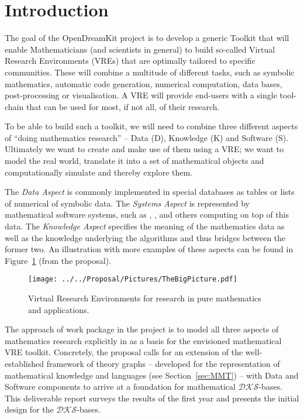 \section{Introduction}\label{sec:intro}

The goal of the OpenDreamKit project \cite{ODKproposal:on} is to develop a generic Toolkit
that will enable Mathematicians (and scientists in general) to build so-called Virtual
Research Environments (VREs) that are optimally tailored to specific communities. These
will combine a multitude of different tasks, such as symbolic mathematics, automatic code
generation, numerical computation, data bases, post-processing or visualisation. A VRE
will provide end-users with a single tool-chain that can be used for most, if not all, of
their research.

To be able to build such a toolkit, we will need to combine three different aspects of
``doing mathematics research'' -- Data (D), Knowledge (K) and Software (S). Ultimately we want to
create and make use of them using a VRE; we want to model the real world, translate it
into a set of mathematical objects and computationally simulate and thereby explore them. 

The \emph{Data Aspect} is commonly implemented in special databases as tables or lists of
numerical of symbolic data. The \emph{Systems Aspect} is represented by mathematical
software systems, such as \GAP, \SageMath, and others computing on top of this data. The
\emph{Knowledge Aspect} specifies the meaning of the mathematics data as well as the
knowledge underlying the algorithms and thus bridges between the former two. An
illustration with more examples of these aspects can be found in
Figure~\ref{fig:thebigpicture} (from the \pn proposal).

\begin{figure}[ht]\centering
  \texttt{[image: ../../Proposal/Pictures/TheBigPicture.pdf]}
  \caption{Virtual Research Environments for research in pure
    mathematics and applications.}
  \label{fig:thebigpicture}
\end{figure}

The approach of work package  in the \pn project is to model all three
aspects of mathematics research explicitly in as a basis for the envisioned mathematical
VRE toolkit. Concretely, the \pn proposal calls for an extension of the well-established
framework of theory graphs -- developed for the representation of mathematical knowledge
and languages (see Section~\ref{sec:MMT}) -- with Data and Software components to arrive
at a foundation for mathematical $\mathcal{DKS}$-bases. This deliverable report surveys
the results of the first year and presents the initial design for the
$\mathcal{DKS}$-bases.

